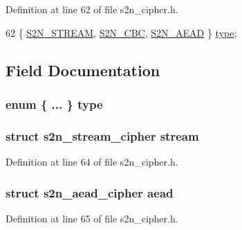 Definition at line 62 of file s2n\+\_\+cipher.\+h.


\begin{DoxyCode}
62 \{ \hyperlink{structs2n__cipher_a99fb83031ce9923c84392b4e92f956b5a67a2e47925a8915cedd60c12c952a85d}{S2N\_STREAM}, \hyperlink{structs2n__cipher_a99fb83031ce9923c84392b4e92f956b5ab230bfe57512cd4305631ef6f92da966}{S2N\_CBC}, \hyperlink{structs2n__cipher_a99fb83031ce9923c84392b4e92f956b5ad3bf6902b630c4f86723fff6e6ce85f5}{S2N\_AEAD} \} \hyperlink{structs2n__cipher_a7d741701c2036f0ec21372f9d8271b6c}{type};
\end{DoxyCode}


\subsection{Field Documentation}
\subsubsection[{\texorpdfstring{type}{type}}]{\setlength{\rightskip}{0pt plus 5cm}enum \{ ... \}   type}\hypertarget{structs2n__cipher_a7d741701c2036f0ec21372f9d8271b6c}{}\label{structs2n__cipher_a7d741701c2036f0ec21372f9d8271b6c}
\subsubsection[{\texorpdfstring{stream}{stream}}]{\setlength{\rightskip}{0pt plus 5cm}struct {\bf s2n\+\_\+stream\+\_\+cipher} stream}\hypertarget{structs2n__cipher_a86b4ea19595781516c4e0a14c959db1c}{}\label{structs2n__cipher_a86b4ea19595781516c4e0a14c959db1c}


Definition at line 64 of file s2n\+\_\+cipher.\+h.

\subsubsection[{\texorpdfstring{aead}{aead}}]{\setlength{\rightskip}{0pt plus 5cm}struct {\bf s2n\+\_\+aead\+\_\+cipher} aead}\hypertarget{structs2n__cipher_a8d9b4c808e73d45bcd7d54784bef3ee0}{}\label{structs2n__cipher_a8d9b4c808e73d45bcd7d54784bef3ee0}


Definition at line 65 of file s2n\+\_\+cipher.\+h.

